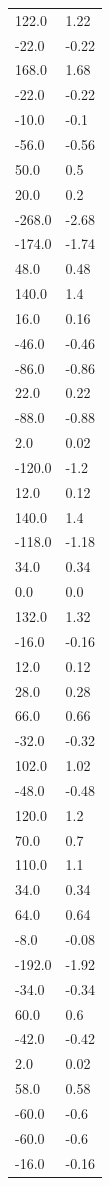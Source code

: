 \begin{longtable}{ll}
122.0 & 1.22 \\
-22.0 & -0.22 \\
168.0 & 1.68 \\
-22.0 & -0.22 \\
-10.0 & -0.1 \\
-56.0 & -0.56 \\
50.0 & 0.5 \\
20.0 & 0.2 \\
-268.0 & -2.68 \\
-174.0 & -1.74 \\
48.0 & 0.48 \\
140.0 & 1.4 \\
16.0 & 0.16 \\
-46.0 & -0.46 \\
-86.0 & -0.86 \\
22.0 & 0.22 \\
-88.0 & -0.88 \\
2.0 & 0.02 \\
-120.0 & -1.2 \\
12.0 & 0.12 \\
140.0 & 1.4 \\
-118.0 & -1.18 \\
34.0 & 0.34 \\
0.0 & 0.0 \\
132.0 & 1.32 \\
-16.0 & -0.16 \\
12.0 & 0.12 \\
28.0 & 0.28 \\
66.0 & 0.66 \\
-32.0 & -0.32 \\
102.0 & 1.02 \\
-48.0 & -0.48 \\
120.0 & 1.2 \\
70.0 & 0.7 \\
110.0 & 1.1 \\
34.0 & 0.34 \\
64.0 & 0.64 \\
-8.0 & -0.08 \\
-192.0 & -1.92 \\
-34.0 & -0.34 \\
60.0 & 0.6 \\
-42.0 & -0.42 \\
2.0 & 0.02 \\
58.0 & 0.58 \\
-60.0 & -0.6 \\
-60.0 & -0.6 \\
-16.0 & -0.16 \\

\end{longtable}

